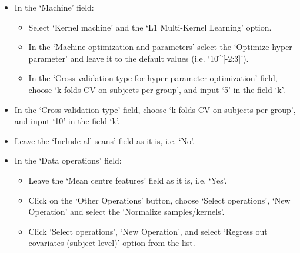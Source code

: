 \begin{itemize}
\begin{itemize}
		\item Similar to Class (1),  write `NonDem' on the name field for Class (2), or use Dependency to choose the second group's name. Then fill the group name using Dependency, i.e. the second group's name created in the `Data \& Design' module, `NonDem'. In the `Subjects' field of Group 2, type `1:50'. In Conditions/Scans, select `All scans'. 
		
		\item Finally leave `Subsample example based on class definition' as it is, i.e. `No'.

		\end{itemize}			
		
	\item In the `Machine' field:
	
	\begin{itemize}
	
	\item Select `Kernel machine' and the `L1 Multi-Kernel Learning' option.	
	
	\item In the `Machine optimization and parameters' select the `Optimize hyper-parameter' and leave it to the default values (i.e. `10\^{}[-2:3]').
	
	\item In the `Cross validation type for hyper-parameter optimization' field, choose `k-folds CV on subjects per group', and input `5' in the field `k'.  
	
	
	\end{itemize}
	
	\item In the `Cross-validation type' field, choose `k-folds CV on subjects per group', and input `10' in the field `k'.
	
	\item Leave the `Include all scans' field as it is, i.e. `No'.

	\item In the `Data operations' field:
	
		\begin{itemize}
		\item  Leave the `Mean centre features' field as it is, i.e. `Yes'. 
				
		\item  Click on the `Other Operations' button, choose `Select operations', `New Operation' and select the `{\color{black}Normalize samples/kernels'}. 
		
		\item Click `Select operations', `New Operation', and select `Regress out covariates (subject level)' option from the list. 
		\end{itemize}
\end{itemize}

